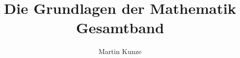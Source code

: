 \documentclass[a4paper,11pt]{report}
\newcounter{file}
\begin{document}
\hypersetup{hypertexnames=false}
\renewcommand{\theHtable}{\FormulaBandID.\arabic{chapter}.\arabic{table}}
\renewcommand{\theHfigure}{\FormulaBandID.\arabic{chapter}.\arabic{figure}}
\title{Die Grundlagen der Mathematik\\Gesamtband}
\author{Martin Kunze}
\date{}
\maketitle
\setcounter{tocdepth}{3}
\tableofcontents
\let\maketitle\relax
\let\tableofcontents\relax
\def\title#1{}
\def\author#1{}
\def\date#1{}
\clearpage

\begingroup
{}

\clearpage
\endgroup



\clearpage
{}


\clearpage
{}


\clearpage
{}


\clearpage
{}


\clearpage
{}


\clearpage
{}


\clearpage
{}


\clearpage
{}


\clearpage
{}

\end{document}
